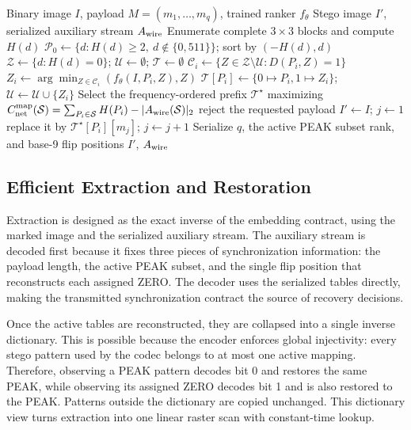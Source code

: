 \documentclass[a4paper,fleqn]{cas-dc}
\newcommand{\RevisionAddBegin}{\begingroup\color{revisionblue}}
\newcommand{\RevisionAddEnd}{\endgroup}
\begin{document}
\begin{algorithm*}[t]
\caption{Net-Aware CNN-Ranked Distance-One Embedding}
\label{alg:embedding}
\begin{algorithmic}[1]
\Require Binary image $I$, payload $M=(m_1,\ldots,m_q)$, trained ranker $f_\theta$
\Ensure Stego image $I'$, serialized auxiliary stream $A_{\rm wire}$
\State Enumerate complete $3\times3$ blocks and compute $H(d)$
\State $\mathcal P_0\gets\{d:H(d)\ge2,\ d\notin\{0,511\}\}$; sort by $(-H(d),d)$
\State $\mathcal Z\gets\{d:H(d)=0\}$; $\mathcal U\gets\emptyset$; $\mathcal T\gets\emptyset$
    \State $\mathcal C_i\gets\{Z\in\mathcal Z\setminus\mathcal U:D(P_i,Z)=1\}$
        \State $Z_i\gets\arg\min_{Z\in\mathcal C_i}(f_\theta(I,P_i,Z),Z)$
        \State $\mathcal T[P_i]\gets\{0\mapsto P_i,1\mapsto Z_i\}$;
        $\mathcal U\gets\mathcal U\cup\{Z_i\}$
    \EndIf
\EndFor
\State Select the frequency-ordered prefix $\mathcal T^\star$ maximizing
\RevisionAddBegin
$C_{\rm net}^{\rm map}(\mathcal S)=
\sum_{P_i\in\mathcal S}H(P_i)-|A_{\rm wire}(\mathcal S)|_2$
\RevisionAddEnd
{}
    \State reject the requested payload
\EndIf
\State $I'\gets I$; $j\gets1$
        \State replace it by $\mathcal T^\star[P_i][m_j]$; $j\gets j+1$
    \EndIf
\EndFor
\State Serialize $q$, the active PEAK subset rank, and base-9 flip positions
\State \Return $I'$, $A_{\rm wire}$
\end{algorithmic}
\end{algorithm*}

\subsection{Efficient Extraction and Restoration}
\RevisionAddBegin
Extraction is designed as the exact inverse of the embedding contract, using
the marked image and the serialized auxiliary stream. The auxiliary stream
is decoded first because it fixes three pieces of synchronization information:
the payload length, the active PEAK subset, and the single flip position that
reconstructs each assigned ZERO. The decoder uses the serialized tables
directly, making the transmitted synchronization contract the source of
recovery decisions.

Once the active tables are reconstructed, they are collapsed into a single
inverse dictionary. This is possible because the encoder enforces global
injectivity: every stego pattern used by the codec belongs to at most one active
mapping. Therefore, observing a PEAK pattern decodes bit 0 and restores the same
PEAK, while observing its assigned ZERO decodes bit 1 and is also restored to
the PEAK. Patterns outside the dictionary are copied unchanged. This dictionary
view turns extraction into one linear raster scan with constant-time lookup.
\end{document}

